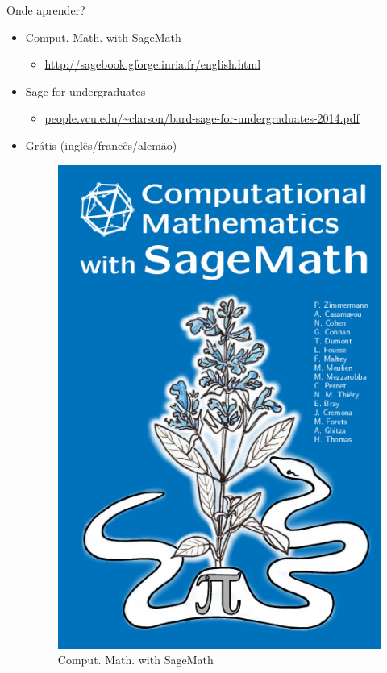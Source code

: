 \documentclass[12pt]{beamer}
\begin{document}
\begin{frame}
  {Onde aprender?}
  \begin{itemize}
    \item Comput. Math. with SageMath
    \begin{itemize}
       \item  \url{http://sagebook.gforge.inria.fr/english.html}
     \end{itemize}
    \item Sage for undergraduates
    \begin{itemize}
      \item \url{people.vcu.edu/~clarson/bard-sage-for-undergraduates-2014.pdf}
    \end{itemize}
    \item Grátis (inglês/francês/alemão)
    \begin{figure}[h]
      \centering
      \begin{minipage}{.4\textwidth}
              \includegraphics[scale=0.15]{img/couverture_en.jpg}
      \caption{Comput. Math. with SageMath}

\end{minipage}
\end{figure}
\end{itemize}
\end{frame}
\end{document}

